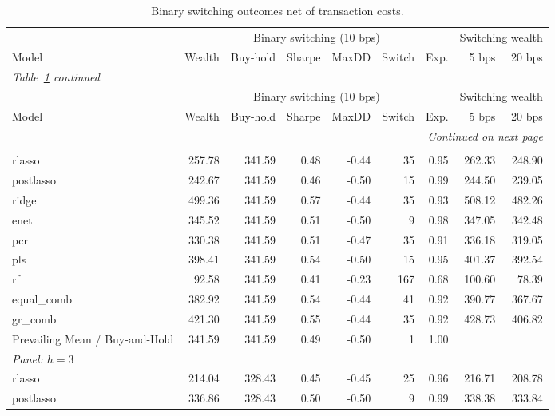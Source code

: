 \begingroup
\setlength{\LTpost}{0.5\baselineskip}
\setlength{\tabcolsep}{3.9pt}
\begin{longtable}{lrrrrrrrr}
\caption{Binary switching outcomes net of transaction costs.}\label{tab:table3} \\
\toprule
& \multicolumn{6}{c}{Binary switching (10 bps)} & \multicolumn{2}{c}{Switching wealth} \\
\cmidrule(lr){2-7} \cmidrule(lr){8-9}
Model & Wealth & Buy-hold & Sharpe & MaxDD & Switch & Exp. & 5 bps & 20 bps \\
\midrule
\endfirsthead
\multicolumn{9}{l}{\emph{Table~\ref{tab:table3} continued}} \\
\toprule
& \multicolumn{6}{c}{Binary switching (10 bps)} & \multicolumn{2}{c}{Switching wealth} \\
\cmidrule(lr){2-7} \cmidrule(lr){8-9}
Model & Wealth & Buy-hold & Sharpe & MaxDD & Switch & Exp. & 5 bps & 20 bps \\
\midrule
\endhead
\midrule
\multicolumn{9}{r}{\emph{Continued on next page}} \\
\endfoot
\bottomrule
\endlastfoot
\multicolumn{9}{l}{\emph{Panel: $h=1$}} \\*
rlasso & 257.78 & 341.59 & 0.48 & -0.44 &  35 & 0.95 & 262.33 & 248.90 \\*
postlasso & 242.67 & 341.59 & 0.46 & -0.50 &  15 & 0.99 & 244.50 & 239.05 \\*
ridge & 499.36 & 341.59 & 0.57 & -0.44 &  35 & 0.93 & 508.12 & 482.26 \\*
enet & 345.52 & 341.59 & 0.51 & -0.50 &   9 & 0.98 & 347.05 & 342.48 \\*
pcr & 330.38 & 341.59 & 0.51 & -0.47 &  35 & 0.91 & 336.18 & 319.05 \\*
pls & 398.41 & 341.59 & 0.54 & -0.50 &  15 & 0.95 & 401.37 & 392.54 \\*
rf & 92.58 & 341.59 & 0.41 & -0.23 & 167 & 0.68 & 100.60 & 78.39 \\*
equal\_comb & 382.92 & 341.59 & 0.54 & -0.44 &  41 & 0.92 & 390.77 & 367.67 \\*
gr\_comb & 421.30 & 341.59 & 0.55 & -0.44 &  35 & 0.92 & 428.73 & 406.82 \\*
Prevailing Mean / Buy-and-Hold & 341.59 & 341.59 & 0.49 & -0.50 &   1 & 1.00 &  &  \\
\multicolumn{9}{l}{\emph{Panel: $h=3$}} \\*
rlasso & 214.04 & 328.43 & 0.45 & -0.45 &  25 & 0.96 & 216.71 & 208.78 \\*
postlasso & 336.86 & 328.43 & 0.50 & -0.50 &   9 & 0.99 & 338.38 & 333.84 \\*

\end{longtable}

